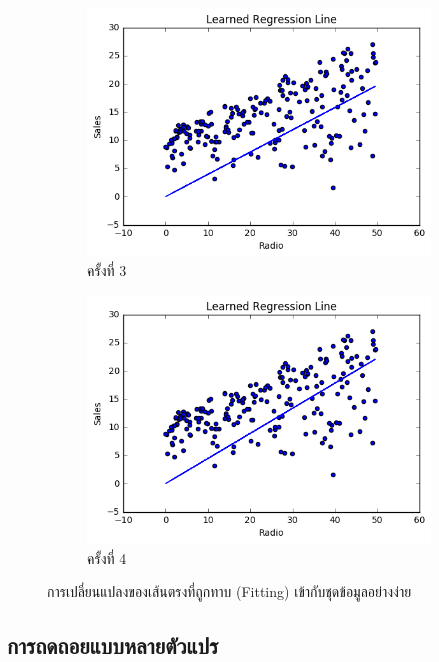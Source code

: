 \begin{figure}[htbp]
    \\
    \vspace{1em}
    \begin{subfigure}{0.5\textwidth}
        \centering
        \includegraphics[width=0.9\linewidth]{fig/plot_simple_reg_3.png}
        \caption{ครั้งที่ 3}
        \label{fig:plot_simple_reg_3}
    \end{subfigure}%
    \begin{subfigure}{0.5\textwidth}
        \centering
        \includegraphics[width=0.9\linewidth]{fig/plot_simple_reg_4.png}
        \caption{ครั้งที่ 4}
        \label{fig:plot_simple_reg_4}
    \end{subfigure}
    \caption{การเปลี่ยนแปลงของเส้นตรงที่ถูกทาบ (Fitting) เข้ากับชุดข้อมูลอย่างง่าย}
    \label{fig:simple_reg_change}
\end{figure}

\subsection{การถดถอยแบบหลายตัวแปร}
\label{ssec:multi_lin_res}

